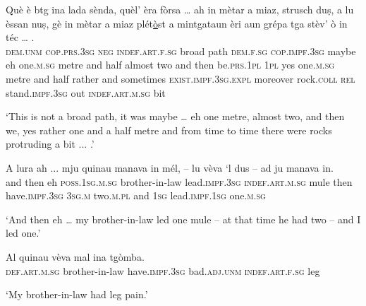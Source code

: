 \begin{linenumbers}
\gll   Què è btg ina lada sènda, quèl’ èra fòrsa … ah in mètar a miaz, strusch duṣ, a lu èssan nuṣ, gè in mètar a miaz plét\underline{ò}st a mintgataun èri aun grépa tga stèv’ ò in téc … . \\
 \textsc{dem.unm} \textsc{cop.prs.3sg} \textsc{neg} \textsc{indef.art.f.sg} broad path \textsc{dem.f.sg} \textsc{cop.impf.3sg} maybe {} eh one.\textsc{m.sg} metre and half almost two and then  be.\textsc{prs.1pl} \textsc{1pl} yes one.\textsc{m.sg} metre and half rather and sometimes  \textsc{exist.impf.3sg.expl} moreover rock.\textsc{coll} \textsc{rel}  stand.\textsc{impf.3sg}  out \textsc{indef.art.m.sg} bit\\
\end{linenumbers}
\medskip
\glt `This is not a broad path, it was maybe … eh one metre, almost two, and then we, yes rather one and a half metre and from time to time there were rocks protruding a bit ... .'
\medskip

\begin{linenumbers}
\gll   A lura ah ... mju quinau manava in mél, – lu vèva `l dus – ad ju manava in. \\
and then eh {} \textsc{poss.1sg.m.sg} brother-in-law lead.\textsc{impf.3sg} \textsc{indef.art.m.sg} mule {} then have.\textsc{impf.3sg} \textsc{3sg.m} two.\textsc{m.pl} {} and \textsc{1sg} lead.\textsc{impf.1sg} one.\textsc{m.sg} \\
\end{linenumbers}
\medskip
\glt `And then eh … my brother-in-law led one mule – at that time he had two – and I led one.'
\medskip

\begin{linenumbers}
\gll   Al quinau vèva mal ina tgòmba. \\
 \textsc{def.art.m.sg} brother-in-law have.\textsc{impf.3sg} bad.\textsc{adj.unm} \textsc{indef.art.f.sg} leg \\
\end{linenumbers}
\medskip
\glt `My brother-in-law had leg pain.'
\medskip

